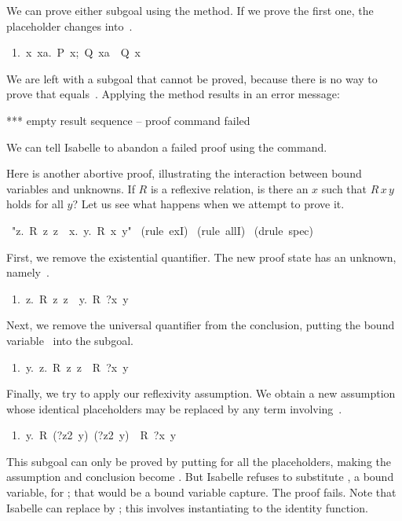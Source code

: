 We can prove either subgoal 
using the  method.  If we prove the first one, the placeholder
changes  into~. 
\begin{isabelle}
\ 1.\ {\isasymAnd}x\ xa.\ {\isasymlbrakk}P\ x;\ Q\ xa\isasymrbrakk\
\isasymLongrightarrow\ Q\ x
\end{isabelle}
We are left with a subgoal that cannot be proved, 
because there is no way to prove that 
equals~.  Applying the  method results in an
error message:
\begin{isabelle}
*** empty result sequence -- proof command failed
\end{isabelle}
We can tell Isabelle to abandon a failed proof using the  command.

\medskip 

Here is another abortive proof, illustrating the interaction between 
bound variables and unknowns.  
If $R$ is a reflexive relation, 
is there an $x$ such that $R\,x\,y$ holds for all $y$?  Let us see what happens when
we attempt to prove it. 
\begin{isabelle}
\ "{\isasymforall}z.\ R\ z\ z\ \isasymLongrightarrow\
{\isasymexists}x.\ {\isasymforall}y.\ R\ x\ y"\isanewline
{}\ (rule\ exI)\isanewline
\isacommand{apply}\ (rule\ allI)\isanewline
\isacommand{apply}\ (drule\ spec)\isanewline
\isacommand{oops}
\end{isabelle}
First, 
we remove the existential quantifier. The new proof state has 
an unknown, namely~. 
\begin{isabelle}
\ 1.\ {\isasymforall}z.\ R\ z\ z\ \isasymLongrightarrow\ {\isasymforall}y.\ R\ ?x\ y
\end{isabelle}
Next, we remove the universal quantifier 
from the conclusion, putting the bound variable~ into the subgoal. 
\begin{isabelle}
\ 1.\ {\isasymAnd}y.\ {\isasymforall}z.\ R\ z\ z\ \isasymLongrightarrow\ R\ ?x\ y
\end{isabelle}
Finally, we try to apply our reflexivity assumption.  We obtain a 
new assumption whose identical placeholders may be replaced by 
any term involving~\bigisa{y}. 
\begin{isabelle}
\ 1.\ {\isasymAnd}y.\ R\ (?z2\ y)\ (?z2\ y)\ \isasymLongrightarrow\ R\ ?x\ y
\end{isabelle}
This subgoal can only be proved by putting  for all the placeholders,
making the assumption and conclusion become . 
But Isabelle refuses to substitute , a bound variable, for
\bigisa{?x}; that would be a bound variable capture.  The proof fails.
Note that Isabelle can replace \bigisa{?z2~y} by \bigisa{y}; this involves
instantiating
\bigisa{?z2} to the identity function.

